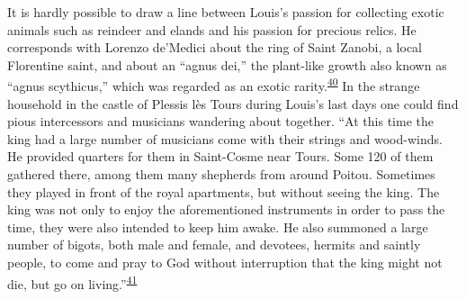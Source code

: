 It is hardly possible to draw a line between Louis's passion for
collecting exotic animals such as reindeer and elands and his passion
for precious relics. He corresponds with Lorenzo de'Medici about the
ring of Saint Zanobi, a local Florentine saint, and about an ``agnus
dei,'' the plant-like growth also known as ``agnus scythicus,'' which
was regarded as an exotic
rarity.\textsuperscript{\protect\hypertarget{14_Chapter_Seven__THE_PIOUS_PERSONA.xhtmlux5cux23id_945}{\protect\hyperlink{23_NOTES.xhtmlux5cux23page_422}{40}}}
In the strange household in the castle of Plessis lès Tours during
Louis's last days one could find pious intercessors and musicians
wandering about together. ``At this time the king had a large number of
musicians come with their strings and wood-winds. He provided quarters
for them in Saint-Cosme near Tours. Some 120 of them gathered there,
among them many shepherds from around Poitou. Sometimes they played in
front of the royal apartments, but without seeing the king. The king was
not only to enjoy the aforementioned instruments in order to pass the
time, they were also intended to keep him awake. He also summoned a
large number of bigots,
\protect\hypertarget{14_Chapter_Seven__THE_PIOUS_PERSONA.xhtmlux5cux23page_216}{}{}both
male and female, and devotees, hermits and saintly people, to come and
pray to God without interruption that the king might not die, but go on
living.''\textsuperscript{\protect\hypertarget{14_Chapter_Seven__THE_PIOUS_PERSONA.xhtmlux5cux23id_943}{\protect\hyperlink{23_NOTES.xhtmlux5cux23id_944}{41}}}

